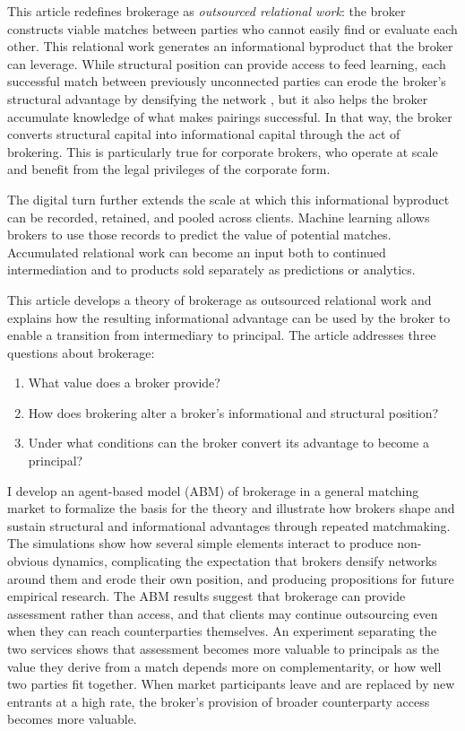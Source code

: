 \documentclass[
]{article}
\begin{document}
This article redefines brokerage as \emph{outsourced relational work}: the broker constructs viable matches between parties who cannot easily find or evaluate each other. This relational work generates an informational byproduct that the broker can leverage. While structural position can provide access to feed learning, each successful match between previously unconnected parties can erode the broker's structural advantage by densifying the network \autocite[356]{burtNetworkStructureSocial2000}, but it also helps the broker accumulate knowledge of what makes pairings successful. In that way, the broker converts structural capital into informational capital through the act of brokering. This is particularly true for corporate brokers, who operate at scale and benefit from the legal privileges of the corporate form.

The digital turn further extends the scale at which this informational byproduct can be recorded, retained, and pooled across clients. Machine learning allows brokers to use those records to predict the value of potential matches. Accumulated relational work can become an input both to continued intermediation and to products sold separately as predictions or analytics.

This article develops a theory of brokerage as outsourced relational work and explains how the resulting informational advantage can be used by the broker to enable a transition from intermediary to principal. The article addresses three questions about brokerage:

\begin{enumerate}
\def\labelenumi{(\roman{enumi})}
\item What value does a broker provide?
\item How does brokering alter a broker's informational and structural position?
\item Under what conditions can the broker convert its advantage to become a principal?
\end{enumerate}

I develop an agent-based model (ABM) of brokerage in a general matching market to formalize the basis for the theory and illustrate how brokers shape and sustain structural and informational advantages through repeated matchmaking. The simulations show how several simple elements interact to produce non-obvious dynamics, complicating the expectation that brokers densify networks around them and erode their own position, and producing propositions for future empirical research. The ABM results suggest that brokerage can provide assessment rather than access, and that clients may continue outsourcing even when they can reach counterparties themselves. An experiment separating the two services shows that assessment becomes more valuable to principals as the value they derive from a match depends more on complementarity, or how well two parties fit together. When market participants leave and are replaced by new entrants at a high rate, the broker's provision of broader counterparty access becomes more valuable.
\end{document}
